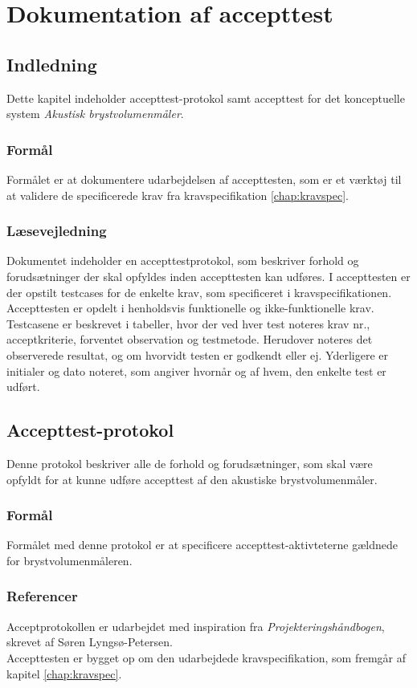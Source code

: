 
\chapter{Dokumentation af accepttest}
	\section{Indledning}
	Dette kapitel indeholder accepttest-protokol samt accepttest for det konceptuelle system \textit{Akustisk brystvolumenmåler}.  
	 		  
	\subsection{Formål}
Formålet er at dokumentere udarbejdelsen af accepttesten, som er et værktøj til at validere de specificerede krav fra kravspecifikation \ref{chap:kravspec}. 
	
		\subsection{Læsevejledning}	
Dokumentet indeholder en accepttestprotokol, som beskriver forhold og forudsætninger der skal opfyldes inden accepttesten kan udføres. I accepttesten er der opstilt testcases for de enkelte krav, som specificeret i kravspecifikationen. Accepttesten er opdelt i henholdsvis funktionelle og ikke-funktionelle krav. Testcasene er beskrevet i tabeller, hvor der ved hver test noteres krav nr., acceptkriterie, forventet observation og testmetode. Herudover noteres det observerede resultat, og om hvorvidt testen er godkendt eller ej. Yderligere er initialer og dato noteret, som angiver hvornår og af hvem, den enkelte test er udført.
	
	\newpage		
			
	\section{Accepttest-protokol}
	Denne protokol beskriver alle de forhold og forudsætninger, som skal være opfyldt for at kunne udføre accepttest af den akustiske brystvolumenmåler. 
	  
		\subsection{Formål}
		Formålet med denne protokol er at specificere accepttest-aktivteterne gældnede for brystvolumenmåleren. 
		
		\subsection{Referencer}
		Acceptprotokollen er udarbejdet med inspiration fra \textit{Projekteringshåndbogen}, skrevet af Søren Lyngsø-Petersen. \\
		Accepttesten er bygget op om den udarbejdede kravspecifikation, som fremgår af kapitel \ref{chap:kravspec}. 
		
